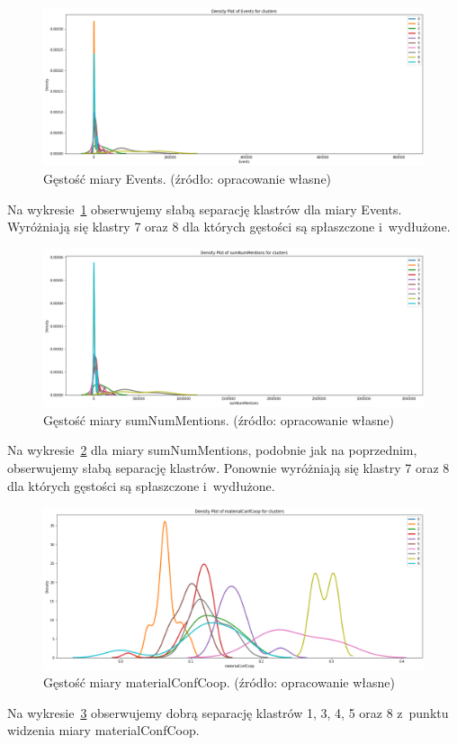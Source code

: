\documentclass[11pt]{report}
\begin{document}
    \begin{figure}[!htp]
        \centering
        \includegraphics[width=\linewidth]{fig/CLUST/density_Events.png}
        \caption{Gęstość miary Events. (źródło: opracowanie własne)}
        \label{fig:density_events}
    \end{figure}
    Na wykresie~\ref{fig:density_events} obserwujemy słabą separację klastrów dla miary Events.
    Wyróżniają się klastry 7 oraz 8 dla których gęstości są spłaszczone i~wydłużone.

    \begin{figure}[!htp]
        \centering
        \includegraphics[width=\linewidth]{fig/CLUST/density_sumNumMentions.png}
        \caption{Gęstość miary sumNumMentions. (źródło: opracowanie własne)}
        \label{fig:density_sumnummentions}
    \end{figure}
    Na wykresie~\ref{fig:density_sumnummentions} dla miary sumNumMentions, podobnie jak na poprzednim, obserwujemy słabą separację klastrów.
    Ponownie wyróżniają się klastry 7 oraz 8 dla których gęstości są spłaszczone i~wydłużone.

    \begin{figure}[!htp]
        \centering
        \includegraphics[width=\linewidth]{fig/CLUST/density_materialConfCoop.png}
        \caption{Gęstość miary materialConfCoop. (źródło: opracowanie własne)}
        \label{fig:density_materialconfcoop}
    \end{figure}
    Na wykresie~\ref{fig:density_materialconfcoop} obserwujemy dobrą separację klastrów 1, 3, 4, 5 oraz 8 z~punktu widzenia miary materialConfCoop.
\end{document}
